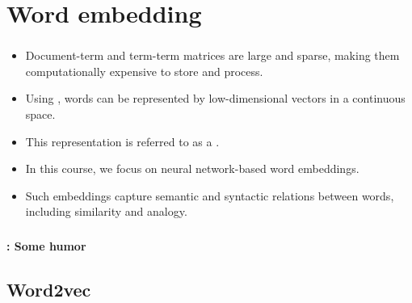 \documentclass[xcolor=table]{beamer}
\begin{document}
\section{Word embedding}

\begin{frame}
	\frametitle{\insertshortsubtitle}
	\framesubtitle{\insertsection}
	
	\begin{itemize}
		\item Document-term and term-term matrices are large and sparse, making them computationally expensive to store and process.
		\item Using , words can be represented by low-dimensional vectors in a continuous space.
		\item This representation is referred to as a .
		\item In this course, we focus on neural network-based word embeddings.
		\item Such embeddings capture semantic and syntactic relations between words, including similarity and analogy.
	\end{itemize}
	
\end{frame}


\begin{frame}
	\frametitle{\insertshortsubtitle}
	\framesubtitle{\insertsection: Some humor}
	
	\begin{center}
	\end{center}

\end{frame}


\subsection{Word2vec}
\end{document}
